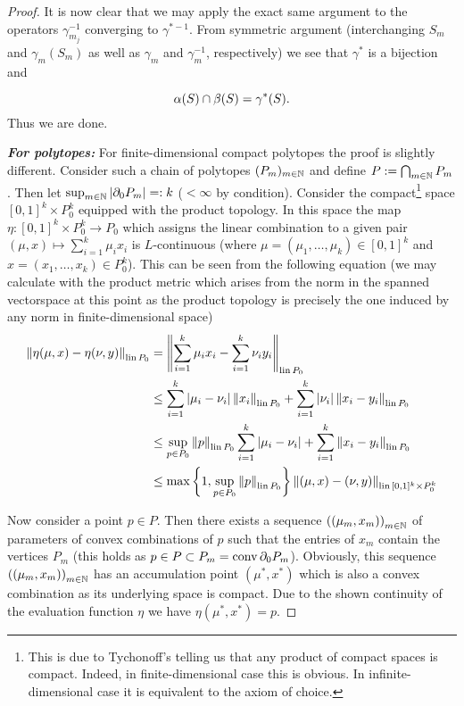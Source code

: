 \documentclass{article}
\begin{document}
\begin{proof}
It is now clear that we may apply the exact same argument to the operators $\gamma^{-1}_{m_j}$ converging to $\gamma^{*-1}$. From symmetric argument (interchanging $S_m$ and $\gamma_m(S_m)$ as well as $\gamma_m$ and $\gamma^ {-1}_m$, respectively) we see that $\gamma^*$ is a bijection and

\begin{equation}
\alpha(S)\cap\beta(S) = \gamma^*(S)\text{.}
\end{equation}
Thus we are done.

\textbf{\emph{For polytopes:}} For finite-dimensional compact polytopes the proof is slightly different. Consider such a chain of polytopes $(P_m)_{m\in\mathbb{N}}$ and define $P:=\bigcap_{m\in\mathbb{N}}{P_m}$. Then let $\sup_{m\in\mathbb{N}}|\partial_0{P_m}|=:k$ ($<\infty$ by condition). Consider the compact\footnote{This is due to Tychonoff's telling us that any product of compact spaces is compact. Indeed, in finite-dimensional case this is obvious. In infinite-dimensional case it is equivalent to the axiom of choice.} space $[0,1]^k\times P^k_0$ equipped with the product topology. In this space the map $\eta:[0,1]^k\times P^k_0\to P_0$ which assigns the linear combination to a given pair $(\mu,x)\mapsto \sum_{i=1}^k{\mu_i x_i}$ is $L$-continuous (where $\mu=(\mu_1,\ldots,\mu_k)\in [0,1]^k$ and $x=(x_1,\ldots,x_k)\in P^k_0$). This can be seen from the following equation (we may calculate with the product metric which arises from the norm in the spanned vectorspace at this point as the product topology is 
precisely the one induced by any norm in finite-dimensional space)
\begin{align}
\left\Vert \eta(\mu,x)-\eta(\nu,y) \right\Vert_{\operatorname{lin}{P_0}} & =\left\Vert \sum_{i=1}^k{\mu_i x_i} -\sum_{i=1}^k{\nu_i y_i} \right\Vert_{\operatorname{lin}{P_0}}\\
& \leq \sum_{i=1}^k{|\mu_i-\nu_i| \left\Vert x_i \right\Vert_{\operatorname{lin}{P_0}}}+\sum_{i=1}^k{|\nu_i| \left\Vert x_i-y_i \right\Vert_{\operatorname{lin}{P_0}}}\\
& \leq \sup_{p\in P_0}{\left\Vert p \right\Vert_{\operatorname{lin}{P_0}}}\sum_{i=1}^k{|\mu_i-\nu_i|} +\sum_{i=1}^k{\left\Vert x_i-y_i \right\Vert_{\operatorname{lin}{P_0}}}\\
& \leq \max\left\{1,\sup_{p\in P_0}{\left\Vert p \right\Vert_{\operatorname{lin}{P_0}}}\right\}\left\Vert (\mu,x)-(\nu,y) \right\Vert_{\operatorname{lin}{[0,1]^k\times P^k_0}}
\end{align}

Now consider a point $p\in P$. Then there exists a sequence $\left((\mu_m,x_m)\right)_{m\in\mathbb{N}}$ of parameters of convex combinations of $p$ such that the entries of $x_m$ contain the vertices $P_m$ (this holds as $p\in P\subset P_m = \operatorname{conv}{\partial_0{P_m}}$). Obviously, this sequence $\left((\mu_m,x_m)\right)_{m\in\mathbb{N}}$ has an accumulation point $(\mu^*,x^*)$ which is also a convex combination as its underlying space is compact. Due to the shown continuity of the evaluation function $\eta$ we have $\eta(\mu^*,x^*)=p$. 


\end{proof}
\end{document}
